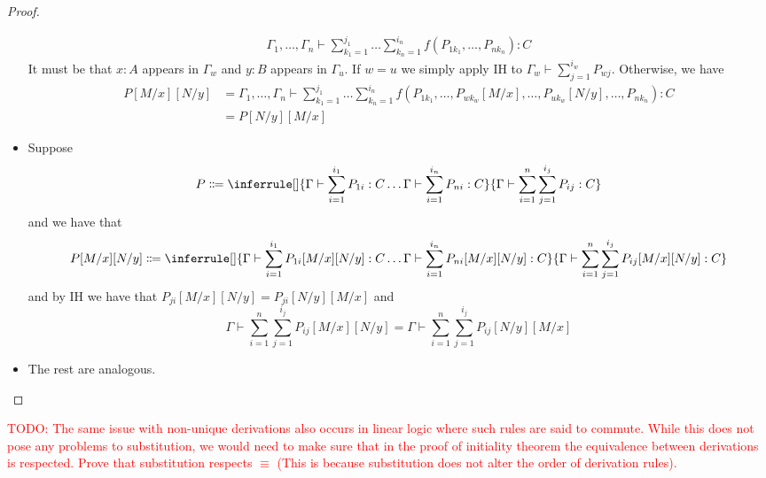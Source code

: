 \documentclass[acmsmall,screen, nonacm, anonymous]{acmart}
\begin{document}
\begin{proof}
\begin{itemize}
\begin{gather*}
{          }{
            \Gamma_1, \ldots, \Gamma_n \vdash \sum_{k_1=1}^{j_1}\ldots\sum_{k_n=1}^{i_n}f(P_{1k_1},\ldots,P_{nk_{n}}): C
          }
      \end{gather*}
      It must be that $x : A$ appears in $\Gamma_w$ and $y : B$ appears in $\Gamma_u$. If $w = u$ we simply apply IH to $\Gamma_w \vdash \sum_{j=1}^{i_w}P_{wj}$.
      Otherwise, we have
      \begin{align*}
      P[M/x][N/y] &= \Gamma_1, \ldots, \Gamma_n \vdash \sum_{k_1=1}^{j_1}\ldots\sum_{k_n=1}^{i_n}f(P_{1k_1},\ldots, P_{wk_w}[M/x],\ldots, P_{uk_{w}}[N/y] ,\ldots,P_{nk_{n}}): C\\
                  &= P[N/y][M/x]
      \end{align*}
    \item Suppose
    \begin{gather*}
      P \Coloneqq \inferrule[]{\Gamma \vdash \sum_{i=1}^{i_1}P_{1i} : C \ldots \Gamma \vdash \sum_{i=1}^{i_n}P_{ni} : C}{\Gamma \vdash \sum_{i=1}^{n}\sum_{j=1}^{i_j}P_{ij} : C}
    \end{gather*}
    and we have that 
    \begin{gather*}
      P[M/x][N/y] \Coloneqq \inferrule[]{\Gamma \vdash \sum_{i=1}^{i_1}P_{1i}[M/x][N/y] : C \ldots \Gamma \vdash \sum_{i=1}^{i_n}P_{ni}[M/x][N/y] : C}{\Gamma \vdash \sum_{i=1}^{n}\sum_{j=1}^{i_j}P_{ij}[M/x][N/y] : C}
    \end{gather*}
    and by IH we have that $P_{ji}[M/x][N/y] = P_{ji}[N/y][M/x]$ and 
    \[
      \Gamma \vdash \sum_{i=1}^{n}\sum_{j=1}^{i_j}P_{ij}[M/x][N/y] = \Gamma \vdash \sum_{i=1}^{n}\sum_{j=1}^{i_j}P_{ij}[N/y][M/x]
    \] 
    \item The rest are analogous.
  \end{itemize}
\end{proof}


\textcolor{red}{TODO: The same issue with non-unique derivations also occurs in linear logic where such rules are said to commute.
While this does not pose any problems to substitution, we would need to make sure that in the proof of initiality theorem the equivalence between derivations is respected.
Prove that substitution respects $\equiv$ (This is because substitution does not alter the order of derivation rules).
}
\end{document}
